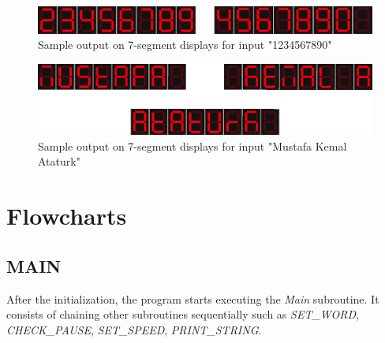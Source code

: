 \documentclass[titlepage]{article}
\begin{document}
	\begin{figure}[h!]
		\centering
		\includegraphics[scale=.45]{../images/fig2.png}
		\caption{Sample output on 7-segment displays for input "1234567890"}
	\end{figure}
	
	\begin{figure}[h!]
		\centering
		\includegraphics[scale=.45]{../images/fig3.png}
		\caption{Sample output on 7-segment displays for input "Mustafa Kemal Ataturk"}
	\end{figure}
	\section{Flowcharts}
	\subsection{MAIN}
	After the initialization, the program starts executing the \textit{Main} subroutine. It consists of chaining other subroutines sequentially such as  \textit{SET\_WORD}, \textit{CHECK\_PAUSE}, \textit{SET\_SPEED}, \textit{PRINT\_STRING}.
	
\end{document}
